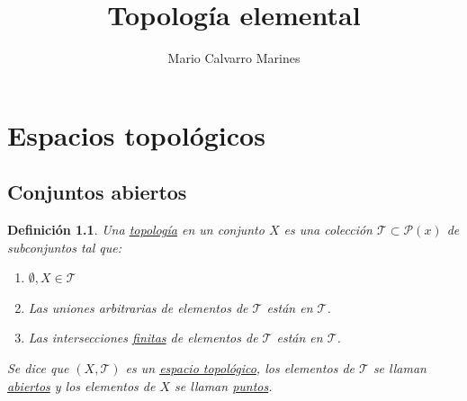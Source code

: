 \documentclass[10pt,a4paper,openright]{book}
\title{Topología elemental}
\author{Mario Calvarro Marines}
\date{}
\theoremstyle{break}
\newtheorem*{defi}{Definición}
\begin{document}
\maketitle
\setcounter{tocdepth}{3}%
\tableofcontents
\chapter{Espacios topológicos}%
\label{cha:espacios_topologicos}

\section{Conjuntos abiertos}%
\label{sec:conjuntos_abiertos}
\begin{defi}
Una \underline{topología} en un conjunto $X$ es una colección $\mathcal{T} \subset \mathcal{P}\left( x \right)$ de subconjuntos tal que:
\begin{enumerate}
    \item $\emptyset, X \in \mathcal{T}$ 
    \item Las uniones arbitrarias de elementos de $\mathcal{T}$ están en $\mathcal{T}$.
    \item Las intersecciones \underline{finitas} de elementos de $\mathcal{T}$ están en $\mathcal{T}$.
\end{enumerate}
Se dice que $\left( X, \mathcal{T} \right)$ es un \underline{espacio topológico}, los elementos de $\mathcal{T}$ se llaman \underline{abiertos} y los elementos de $X$ se llaman \underline{puntos}. 
\end{defi}
\end{document}

